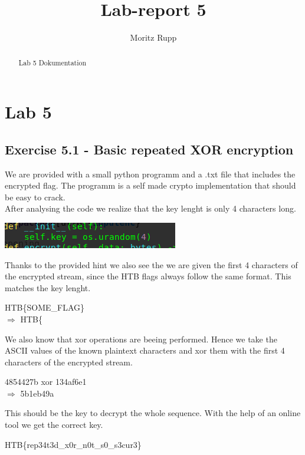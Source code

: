 \documentclass[a4paper,10pt]{article}
\title{Lab-report 5}
\author{Moritz Rupp}
\begin{document}
\maketitle
\tableofcontents
\begin{abstract}
\begin{center}
 Lab 5 Dokumentation

\end{center}

\end{abstract}
\newpage
\section{Lab 5}
\subsection{Exercise 5.1 - Basic repeated XOR encryption}
We are provided with a small python programm and a .txt file that includes the encrypted flag. The programm is a self made crypto implementation that should be easy to crack.\\
After analysing the code we realize that the key lenght is only 4 characters long.	
\begin{center}
 \includegraphics[scale=0.5]{keylen.png}
\end{center}
Thanks to the provided hint we also see the we are given the first 4 characters of the encrypted stream, since the HTB flags always follow the same format. This matches the key lenght.
\begin{center}
 \begin{shaded}
 HTB\{SOME\_FLAG\}\\
 $\Rightarrow$ HTB\{ 
\end{shaded}
\end{center}
We also know that xor operations are beeing performed. Hence we take the ASCII values of the known plaintext characters and xor them with the first 4 characters of the encrypted stream.
\begin{center}
4854427b xor 134af6e1\\
$\Rightarrow$ 5b1eb49a
\end{center}
This should be the key to decrypt the whole sequence. With the help of an online tool we get the correct key.
\begin{center}
 \begin{shaded}
 HTB\{rep34t3d\_x0r\_n0t\_s0\_s3cur3\}
 \end{shaded}
\end{center}
\newpage
\end{document}
